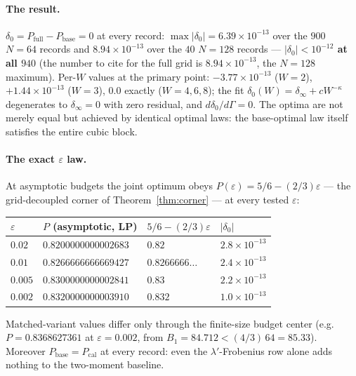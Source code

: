 \documentclass[11pt]{article}
\theoremstyle{plain}
\theoremstyle{definition}
\theoremstyle{remark}
\begin{document}
\paragraph{The result.}
$\delta_0 = P_{\mathrm{full}} - P_{\mathrm{base}} = 0$ at every record:
$\max |\delta_0| = 6.39 \times 10^{-13}$ over the $900$ $N = 64$ records and
$8.94 \times 10^{-13}$ over the $40$ $N = 128$ records ---
\textbf{$|\delta_0| < 10^{-12}$ at all $940$} (the number to cite for the full
grid is $8.94 \times 10^{-13}$, the $N = 128$ maximum). Per-$W$ values at the
primary point: $-3.77 \times 10^{-13}$ ($W = 2$), $+1.44 \times 10^{-13}$
($W = 3$), $0.0$ exactly ($W = 4, 6, 8$); the fit
$\delta_0(W) = \delta_\infty + c W^{-\kappa}$ degenerates to
$\delta_\infty = 0$ with zero residual, and $d\delta_0/d\Gamma = 0$. The optima
are not merely equal but achieved by identical optimal laws: the base-optimal law
itself satisfies the entire cubic block.

\paragraph{The exact $\varepsilon$ law.}
At asymptotic budgets the joint optimum obeys
$P(\varepsilon) = 5/6 - (2/3)\varepsilon$ --- the grid-decoupled corner of
Theorem~\ref{thm:corner} --- at every tested $\varepsilon$:

\begin{table}[h]
\centering
\begin{tabular}{@{}llll@{}}
\toprule
$\varepsilon$ & $P$ (asymptotic, LP) & $5/6 - (2/3)\varepsilon$ &
$|\delta_0|$ \\
\midrule
$0.02$ & $0.8200000000002683$ & $0.82$ & $2.8 \times 10^{-13}$ \\
$0.01$ & $0.8266666666669427$ & $0.8266666\ldots$ & $2.4 \times 10^{-13}$ \\
$0.005$ & $0.8300000000002841$ & $0.83$ & $2.2 \times 10^{-13}$ \\
$0.002$ & $0.8320000000003910$ & $0.832$ & $1.0 \times 10^{-13}$ \\
\bottomrule
\end{tabular}
\end{table}

Matched-variant values differ only through the finite-size budget center (e.g.\
$P = 0.8368627361$ at $\varepsilon = 0.002$, from
$B_1 = 84.712 < (4/3)\,64 = 85.33$). Moreover
$P_{\mathrm{base}} = P_{\mathrm{cal}}$ at every record: even the
$\lambda'$-Frobenius row alone adds nothing to the two-moment baseline.
\end{document}
